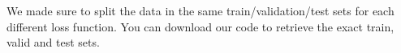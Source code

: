 We made sure to split the data in the same train/validation/test sets for each different loss function. You can download our code to retrieve the exact train, valid and test sets.









